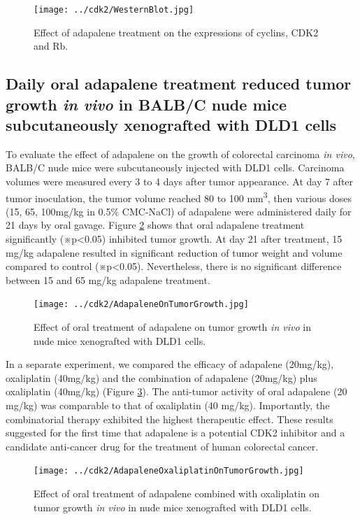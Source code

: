 \documentclass[10pt]{article}
\begin{document}
\begin{figure}
\centering
\texttt{[image: ../cdk2/WesternBlot.jpg]}
\caption{Effect of adapalene treatment on the expressions of cyclins, CDK2 and Rb.}
\label{WesternBlot}
\end{figure}

\subsection*{Daily oral adapalene treatment reduced tumor growth \textit{in vivo} in BALB/C nude mice subcutaneously xenografted with DLD1 cells}

To evaluate the effect of adapalene on the growth of colorectal carcinoma \textit{in vivo}, BALB/C nude mice were subcutaneously injected with DLD1 cells. Carcinoma volumes were measured every 3 to 4 days after tumor appearance. At day 7 after tumor inoculation, the tumor volume reached 80 to 100 mm\textsuperscript{3}, then various doses (15, 65, 100mg/kg in 0.5\% CMC-NaCl) of adapalene were administered daily for 21 days by oral gavage. Figure \ref{AdapaleneOnTumorGrowth} shows that oral adapalene treatment significantly (※p<0.05) inhibited tumor growth. At day 21 after treatment, 15 mg/kg adapalene resulted in significant reduction of tumor weight and volume compared to control (※p<0.05). Nevertheless, there is no significant difference between 15 and 65 mg/kg adapalene treatment.

\begin{figure}
\centering
\texttt{[image: ../cdk2/AdapaleneOnTumorGrowth.jpg]}
\caption{Effect of oral treatment of adapalene on tumor growth \textit{in vivo} in nude mice xenografted with DLD1 cells.}
\label{AdapaleneOnTumorGrowth}
\end{figure}

In a separate experiment, we compared the efficacy of adapalene (20mg/kg), oxaliplatin (40mg/kg) and the combination of adapalene (20mg/kg) plus oxaliplatin (40mg/kg) (Figure \ref{AdapaleneOxaliplatinOnTumorGrowth}). The anti-tumor activity of oral adapalene (20 mg/kg) was comparable to that of oxaliplatin (40 mg/kg). Importantly, the combinatorial therapy exhibited the highest therapeutic effect. These results suggested for the first time that adapalene is a potential CDK2 inhibitor and a candidate anti-cancer drug for the treatment of human colorectal cancer.

\begin{figure}
\centering
\texttt{[image: ../cdk2/AdapaleneOxaliplatinOnTumorGrowth.jpg]}
\caption{Effect of oral treatment of adapalene combined with oxaliplatin on tumor growth \textit{in vivo} in nude mice xenografted with DLD1 cells.}
\label{AdapaleneOxaliplatinOnTumorGrowth}
\end{figure}
\end{document}
